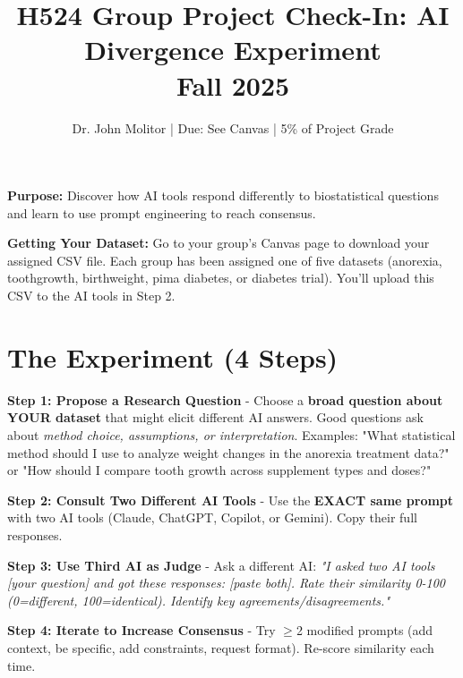 \documentclass[10pt]{article}
\title{\textbf{\textcolor{osaorange}{H524 Group Project Check-In: AI Divergence Experiment}}\\
Fall 2025}
\author{Dr. John Molitor | Due: See Canvas | 5\% of Project Grade}
\date{}
\begin{document}
\maketitle
\vspace{-2em}

\begin{tcolorbox}[colback=aiblue!10,colframe=aiblue,boxrule=1.5pt,arc=2pt,left=4pt,right=4pt,top=3pt,bottom=3pt]
\small
\textbf{Purpose:} Discover how AI tools respond differently to biostatistical questions and learn to use prompt engineering to reach consensus.
\end{tcolorbox}
\vspace{-0.5em}

\begin{tcolorbox}[colback=osaorange!10,colframe=osaorange,boxrule=1.5pt,arc=2pt,left=4pt,right=4pt,top=3pt,bottom=3pt]
\small
\textbf{Getting Your Dataset:} Go to your group's Canvas page to download your assigned CSV file. Each group has been assigned one of five datasets (anorexia, toothgrowth, birthweight, pima diabetes, or diabetes trial). You'll upload this CSV to the AI tools in Step 2.
\end{tcolorbox}
\vspace{-0.5em}

\section*{The Experiment (4 Steps)}

\textbf{Step 1: Propose a Research Question} - Choose a \textbf{broad question about YOUR dataset} that might elicit different AI answers. Good questions ask about \textit{method choice, assumptions, or interpretation}. Examples: "What statistical method should I use to analyze weight changes in the anorexia treatment data?" or "How should I compare tooth growth across supplement types and doses?"

\textbf{Step 2: Consult Two Different AI Tools} - Use the \textbf{EXACT same prompt} with two AI tools (Claude, ChatGPT, Copilot, or Gemini). Copy their full responses.

\textbf{Step 3: Use Third AI as Judge} - Ask a different AI: \textit{"I asked two AI tools [your question] and got these responses: [paste both]. Rate their similarity 0-100 (0=different, 100=identical). Identify key agreements/disagreements."}

\textbf{Step 4: Iterate to Increase Consensus} - Try $\geq$2 modified prompts (add context, be specific, add constraints, request format). Re-score similarity each time.
\end{document}
